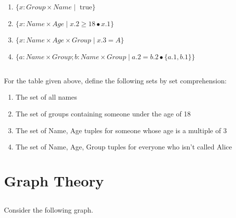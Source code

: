 \documentclass[twocolumn]{article}
\begin{document}
    \begin{enumerate}
        \item $ \{ x : Group \times Name \mid \text{ true} \} $
        \item $ \{ x : Name \times Age \mid x.2 \ge 18 \bullet x.1 \} $
        \item $ \{ x : Name \times Age \times Group \mid x.3 = A \} $
        \item $ \{ a : Name \times Group; b : Name \times Group \mid a.2 = b.2 \bullet \{a.1, b.1\} \} $
    \end{enumerate} 

\subsection{}

    For the table given above, define the following sets by set comprehension:

    \begin{enumerate}
        \item The set of all names
        \item The set of groups containing someone under the age of 18
        \item The set of Name, Age tuples for someone whose age is a multiple of 3
        \item The set of Name, Age, Group tuples for everyone who isn't called Alice 
    \end{enumerate}

\clearpage
\section{Graph Theory}

\subsection{}

    Consider the following graph.

    \begin{figure}[h!]
        \centering
    \end{figure}
\end{document}
